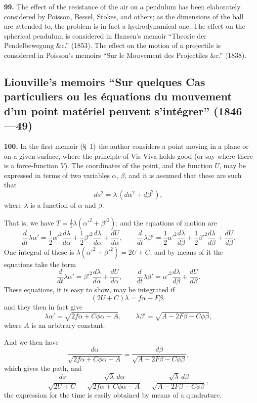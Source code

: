 \documentclass[11pt,a4paper]{article}
\theoremstyle{definition}
\begin{document}
\textbf{99.} The effect of the resistance of the air on a pendulum has been elaborately considered by Poisson, Bessel, Stokes, and others; as the dimensions of the ball are attended to, the problem is in fact a hydrodynamical one. The effect on the spherical pendulum is considered in Hansen's memoir ``Theorie der Pendelbewegung \&c.'' (1853). The effect on the motion of a projectile is considered in Poisson's memoirs ``Sur le Mouvement des Projectiles \&c.'' (1838).

\subsection*{Liouville's memoirs ``Sur quelques Cas particuliers ou les \'equations du mouvement d'un point mat\'eriel peuvent s'int\'egrer'' (1846---49)}

\textbf{100.} In the first memoir (\S~1) the author considers a point moving in a plane or on a given surface, where the principle of Vis Viva holds good (or say where there is a force-function $V$). The coordinates of the point, and the function $U$, may be expressed in terms of two variables $\alpha$, $\beta$, and it is assumed that these are such that
\[
ds^2 = \lambda\,(d\alpha^2 + d\beta^2),
\]
where $\lambda$ is a function of $\alpha$ and $\beta$.

That is, we have $T = \frac{1}{2}\lambda(\alpha'^2 + \beta'^2)$; and the equations of motion are
\[
\frac{d}{dt}\lambda\alpha' = \frac{1}{2}\alpha'^2\frac{d\lambda}{d\alpha} + \frac{1}{2}\beta'^2\frac{d\lambda}{d\alpha} + \frac{dU}{d\alpha}, \qquad
\frac{d}{dt}\lambda\beta' = \frac{1}{2}\alpha'^2\frac{d\lambda}{d\beta} + \frac{1}{2}\beta'^2\frac{d\lambda}{d\beta} + \frac{dU}{d\beta}.
\]
One integral of these is $\lambda(\alpha'^2 + \beta'^2) = 2U + C$; and by means of it the equations take the form
\[
\frac{d}{dt}\lambda\alpha' = \beta'^2\frac{d\lambda}{d\alpha} + \frac{dU}{d\alpha}, \qquad
\frac{d}{dt}\lambda\beta' = \alpha'^2\frac{d\lambda}{d\beta} + \frac{dU}{d\beta}.
\]
These equations, it is easy to show, may be integrated if
\[
(2U + C)\lambda = f\alpha - F\beta,
\]
and they then in fact give
\[
\lambda\alpha' = \sqrt{2f\alpha + C\phi\alpha - A}, \qquad
\lambda\beta' = \sqrt{A - 2F\beta - C\phi\beta},
\]
where $A$ is an arbitrary constant.

And we then have
\[
\frac{d\alpha}{\sqrt{2f\alpha + C\phi\alpha - A}} = \frac{d\beta}{\sqrt{A - 2F\beta - C\phi\beta}},
\]
which gives the path, and
\[
\frac{ds}{\sqrt{2U + C}} = \frac{\sqrt{\lambda}\,d\alpha}{\sqrt{2f\alpha + C\phi\alpha - A}} = \frac{\sqrt{\lambda}\,d\beta}{\sqrt{A - 2F\beta - C\phi\beta}},
\]
the expression for the time is easily obtained by means of a quadrature.
\end{document}
